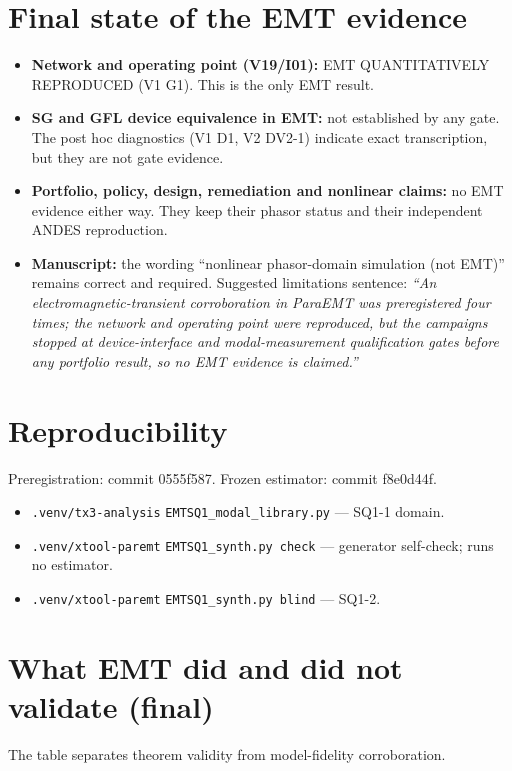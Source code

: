 \documentclass[10pt,a4paper]{article}
\newcommand{\f}[1]{\nolinkurl{#1}}
\begin{document}
\section{Final state of the EMT evidence}
\begin{itemize}
\item \textbf{Network and operating point (V19/I01):} EMT QUANTITATIVELY REPRODUCED (V1 G1). This is the only EMT result.
\item \textbf{SG and GFL device equivalence in EMT:} not established by any gate.
The post hoc diagnostics (V1 D1, V2 DV2-1) indicate exact transcription, but they are not gate evidence.
\item \textbf{Portfolio, policy, design, remediation and nonlinear claims:} no EMT evidence either way.
They keep their phasor status and their independent ANDES reproduction.
\item \textbf{Manuscript:} the wording ``nonlinear phasor-domain simulation (not EMT)'' remains correct and required.
Suggested limitations sentence: \emph{``An electromagnetic-transient corroboration in ParaEMT was preregistered four times; the network and operating point were reproduced, but the campaigns stopped at device-interface and modal-measurement qualification gates before any portfolio result, so no EMT evidence is claimed.''}
\end{itemize}

\section{Reproducibility}
Preregistration: commit 0555f587. Frozen estimator: commit f8e0d44f.
\begin{itemize}
\item \texttt{.venv/tx3-analysis} \f{EMTSQ1_modal_library.py} --- SQ1-1 domain.
\item \texttt{.venv/xtool-paremt} \f{EMTSQ1_synth.py}~\texttt{check} --- generator self-check; runs no estimator.
\item \texttt{.venv/xtool-paremt} \f{EMTSQ1_synth.py}~\texttt{blind} --- SQ1-2.
\end{itemize}

\clearpage
\section*{What EMT did and did not validate (final)}
The table separates theorem validity from model-fidelity corroboration.
\end{document}
